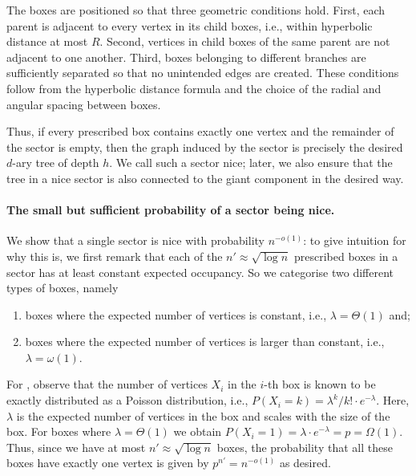 \documentclass[letterpaper,11pt]{article}
\newcommand{\1}{\mathbb I}
\begin{document}
The boxes are positioned so that three geometric conditions hold. First, each parent is adjacent to every vertex in its child boxes, i.e., within hyperbolic distance at most $R$. Second, vertices in child boxes of the same parent are not adjacent to one another. Third, boxes belonging to different branches are sufficiently separated so that no unintended edges are created. These conditions follow from the hyperbolic distance formula and the choice of the radial and angular spacing between boxes.

Thus, if every prescribed box contains exactly one vertex and the remainder of the sector is empty, then the graph induced by the sector is precisely the desired $d$-ary tree of depth $h$. We call such a sector nice; later, we also ensure that the tree in a nice sector is also connected to the giant component in the desired way.

\paragraph{The small but sufficient probability of a sector being nice.}
%
We show that a single sector is nice with probability $n^{-o(1)}$: to give intuition for why this is, we first remark that each of the $n' \approx \sqrt{\log n}$ prescribed boxes in a sector has at least constant expected occupancy. So we categorise two different types of boxes, namely

\begin{enumerate}
    \item\label{item:constantbox} boxes where the expected number of vertices is constant, i.e., $\lambda = \Theta(1)$ and;
    \item\label{item:largerbox} boxes where the expected number of vertices is larger than constant, i.e., $\lambda = \omega(1)$.
\end{enumerate}

 For , observe that the number of vertices $X_i$ in the $i$-th box is known to be exactly distributed as a Poisson distribution, i.e., $P(X_i=k)=\lambda^k/k! \cdot e^{-\lambda}$. Here, $\lambda$ is the expected number of vertices in the box and scales with the size of the box. For boxes where  $\lambda =\Theta(1)$ we obtain $P(X_i=1)=\lambda\cdot e^{-\lambda}=p=\Omega(1)$. Thus, since we have at most $n' \approx \sqrt{\log n}$ boxes, the probability that all these boxes have exactly one vertex is given by $p^{n'} = n^{-o(1)}$ as desired.
\end{document}
